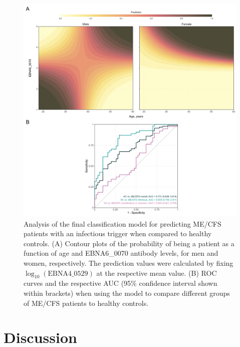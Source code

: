 \begin{figure}[h]
    \centering
    \includegraphics[width=\textwidth]{chapter/2022-revisiting-igg/figures/fig4-final-classification-model-results.png}
    \caption[Analysis of the final classification model for predicting ME/CFS patients with an infectious trigger when compared to healthy controls]{Analysis of the final classification model for predicting ME/CFS patients with an infectious trigger when compared to healthy controls. (A) Contour plots of the probability of being a patient as a function of age and EBNA6\_0070 antibody levels, for men and women, respectively. The prediction values were calculated by fixing $\log_{10}(\text{EBNA4\_0529})$ at the respective mean value. (B) ROC curves and the respective AUC (95\% confidence interval shown within brackets) when using the model to compare different groups of ME/CFS patients to healthy controls.}
    \label{fig:fig4-final-classification-model-results}
\end{figure}

\clearpage
\section{Discussion}

